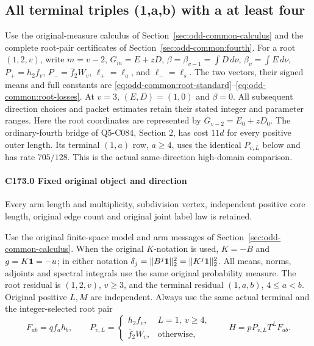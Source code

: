 \subsection{All terminal triples (1,a,b) with a at least four}\label{proof:Q5-C173}
Use the original-measure calculus of
Section~\ref{sec:odd-common-calculus} and the complete root-pair
certificates of Section~\ref{sec:odd-common:fourth}.
For a root \((1,2,v)\), write \(m=v-2\), \(G_m=E+zD\),
\(\beta=\beta_{v-1}=\int D\,d\nu\),
\(\beta_v=\int E\,d\nu\),
\(P_+=h_2f_v\), \(P_-=\bar f_2W_v\),
\(\ell_+=\ell_a\), and \(\ell_-=\ell_s\).
The two vectors, their signed means and full constants are
\eqref{eq:odd-common:root-standard}--\eqref{eq:odd-common:root-losses}.
At \(v=3\), \((E,D)=(1,0)\) and \(\beta=0\).
All subsequent direction choices and packet estimates retain their
stated integer and parameter ranges.
Here the root coordinates are represented by $G_{v-2}=E_0+zD_0$. The ordinary-fourth bridge of Q5-C084, Section 2, has cost $11d$ for every positive outer length. Its terminal $(1,a)$ row, $a\ge4$, uses the identical $P_{v,L}$ below and has rate $705/128$. This is the actual same-direction high-domain comparison.
\paragraph{C173.0 Fixed original object and direction}

Every arm length and multiplicity, subdivision vertex, independent positive core length, original edge count and original joint label law is retained.

Use the original finite-space model and arm messages of
Section~\ref{sec:odd-common-calculus}.
When the original \(K\)-notation is used, \(K=-B\) and
\(g=K\mathbf1=-u\); in either notation
\(\delta_j=\|B^j\mathbf1\|_2^2=\|K^j\mathbf1\|_2^2\).
All means, norms, adjoints and spectral integrals use the same
original probability measure.
The root residual is \((1,\allowbreak \allowbreak  2,\allowbreak \allowbreak  v)\), \(v\ge3\), and the terminal residual \((1,\allowbreak \allowbreak  a,\allowbreak \allowbreak  b)\), \(4\le a<b\). Original positive \(L,\allowbreak \allowbreak  M\) are independent. Always use the same actual terminal and the integer-selected root pair
\[
F_{ab}=qf_a h_b,\qquad
P_{v,L}=\begin{cases}h_2f_v,&L=1,\ v\ge4,\\
\bar f_2W_v,&\text{otherwise},\end{cases}
\qquad H=pP_{v,L}T^LF_{ab}.                         \tag{C173.T183.1}
\]

